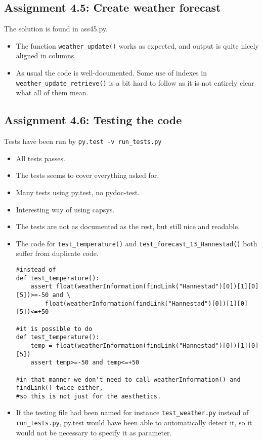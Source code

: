 \documentclass[a4paper]{article}
\begin{document}
\subsection*{Assignment 4.5: Create weather forecast}
The solution is found in ass45.py.
\begin{itemize}
  \item The function \texttt{weather\_update()} works as expected, and output is quite nicely aligned in columns.
  \item As usual the code is well-documented. Some use of indexes in \texttt{weather\_update\_retrieve()} is a bit hard to follow as it is not entirely clear what all of them mean.
\end{itemize}

\subsection*{Assignment 4.6: Testing the code}

Tests have been run by \texttt{py.test -v run\_tests.py}
\begin{itemize}
\item All tests passes.
\item The tests seems to cover everything asked for.
\item Many tests using py.test, no pydoc-test.
  \item Interesting way of using capsys.   
  \item The tests are not as documented as the rest, but still nice and readable.
  \item The code for \texttt{test\_temperature()} and \texttt{test\_forecast\_13\_Hannestad()} both suffer from duplicate code.
  
\begin{verbatim}
#instead of
def test_temperature():
    assert float(weatherInformation(findLink("Hannestad")[0])[1][0][5])>=-50 and \ 
        float(weatherInformation(findLink("Hannestad")[0])[1][0][5])<=+50

#it is possible to do
def test_temperature():
    temp = float(weatherInformation(findLink("Hannestad")[0])[1][0][5])
    assert temp>=-50 and temp<=+50

#in that manner we don't need to call weatherInformation() and findLink() twice either, 
#so this is not just for the aesthetics. 
\end{verbatim}
\item If the testing file had been named for instance \texttt{test\_weather.py} instead of \texttt{run\_tests.py}, py.test would have been able to automatically detect it, so it would not be necessary to specify it as parameter.
\end{itemize}
\end{document}
